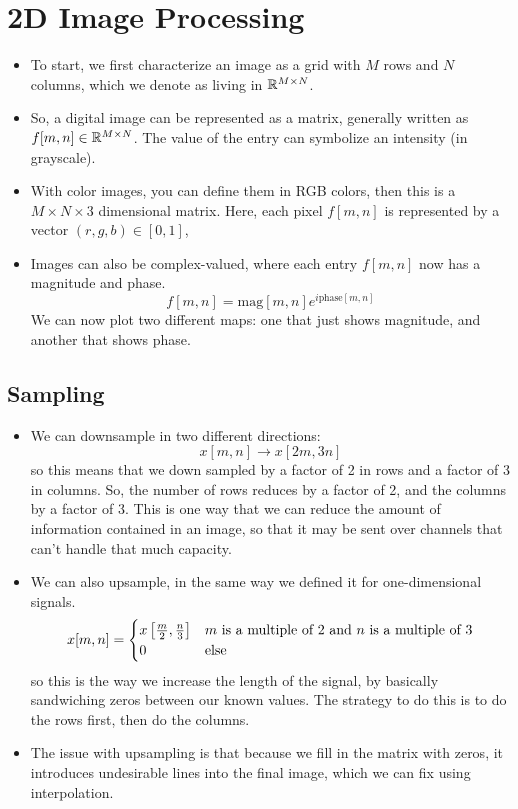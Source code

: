 \section{2D Image Processing}
\begin{itemize}
	\item To start, we first characterize an image as a grid with 
		\( M  \) rows and \( N \) columns, which we denote as 
		living in \( \mathbb R^{M \times N} \). 
	\item So, a digital image can be represented as a matrix, generally 
		written as \( f[m, n] \in \mathbb R^{M \times N} \). The value of the 
		entry can symbolize an intensity (in grayscale).
	\item With color images, you can define them in RGB colors, then this 
		is a \( M \times N \times 3 \) dimensional matrix. Here, 
		each pixel \( f[m, n] \) is represented by a vector 
		\( (r, g, b) \in [0, 1] \), 
	\item Images can also be complex-valued, where each entry \( f[m, n] \) now has a magnitude and phase. 
		 \[
			 f[m, n] = \text{mag}[m, n] e^{i \text{phase}[m, n]}
		\] 
		We can now
		plot two different maps: one that just shows magnitude, and another that shows phase. 
\end{itemize}
\subsection{Sampling}
\begin{itemize}
	\item We can downsample in two different directions:
		\[
			x[m, n] \to x[2m, 3n]
		\] 
		so this means that we down sampled by a factor of 2 in rows and a factor of 3 in columns. So, the number of 
		rows reduces by a factor of 2, and the columns by a factor of 3. This is one way that we can reduce 
		the amount of information contained in an image, so that it may be sent over channels that can't handle 
		that much capacity. 
	\item We can also upsample, in the same way we defined it for one-dimensional signals.
		\[
			x[m, n] = \begin{cases}
				x\left[ \frac{m}{2}, \frac{n}{3} \right] & \text{\( m \) is a multiple of 2 and \( n \) is a multiple of 3}\\
				0 & \text{else}
			\end{cases}
		\] 
		so this is the way we increase the length of the signal, by basically sandwiching zeros between our known 
		values. The strategy to do this is to do the rows first, then do the columns.    
	\item The issue with upsampling is that because we fill in the matrix with zeros, it introduces undesirable 
		lines into the final image, which we can fix using interpolation.   
\end{itemize}
